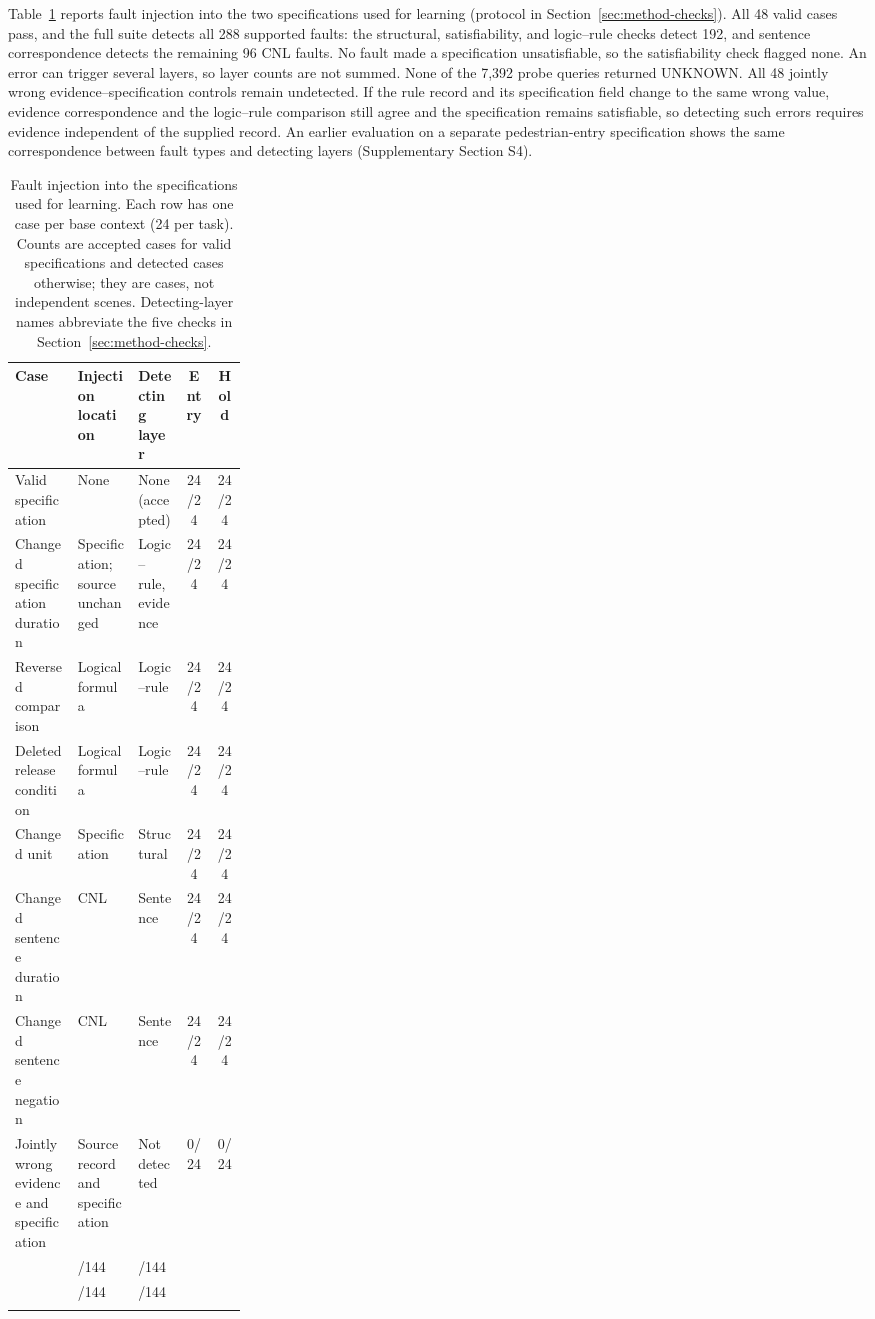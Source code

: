Table~\ref{tab:results-faults} reports fault injection into the two
specifications used for learning (protocol in Section~\ref{sec:method-checks}).
All 48 valid cases pass, and the full suite detects all 288 supported faults:
the structural, satisfiability, and logic--rule checks detect 192, and sentence
correspondence detects the remaining 96 CNL faults. No fault made a
specification unsatisfiable, so the satisfiability check flagged none. An error
can trigger several layers, so layer counts are not summed. None of the 7,392
probe queries returned UNKNOWN. All 48 jointly wrong evidence--specification
controls remain undetected. If the rule record and its specification field
change to the same wrong value, evidence correspondence and the logic--rule comparison
still agree and the specification remains satisfiable, so detecting such errors
requires evidence independent of the supplied record. An earlier evaluation on
a separate pedestrian-entry specification shows the same correspondence
between fault types and detecting layers (Supplementary Section S4).

\begin{table}[tbp]
\caption{Fault injection into the specifications used for learning. Each row
has one case per base context (24 per task). Counts are accepted cases for
valid specifications and detected cases otherwise; they are cases, not
independent scenes. Detecting-layer names abbreviate the five checks in
Section~\ref{sec:method-checks}.}
\label{tab:results-faults}
\footnotesize
\begin{tabularx}{\linewidth}{@{}>{\raggedright\arraybackslash}p{0.27\linewidth}>{\raggedright\arraybackslash}X>{\raggedright\arraybackslash}X cc@{}}
\toprule
Case & Injection location & Detecting layer & Entry & Hold\\
\midrule
Valid specification & None & None (accepted) & 24/24 & 24/24\\[3pt]
Changed specification duration & Specification; source unchanged & Logic--rule, evidence & 24/24 & 24/24\\[3pt]
Reversed comparison & Logical formula & Logic--rule & 24/24 & 24/24\\[3pt]
Deleted release condition & Logical formula & Logic--rule & 24/24 & 24/24\\[3pt]
Changed unit & Specification & Structural & 24/24 & 24/24\\[3pt]
Changed sentence duration & CNL & Sentence & 24/24 & 24/24\\[3pt]
Changed sentence negation & CNL & Sentence & 24/24 & 24/24\\[3pt]
Jointly wrong evidence and specification & Source record and specification & Not detected & 0/24 & 0/24\\
\midrule
\multicolumn{3}{@{}l}{Supported faults: structural, satisfiability, logic--rule} & 96/144 & 96/144\\[3pt]
\multicolumn{3}{@{}l}{Supported faults: full suite} & 144/144 & 144/144\\
\botrule
\end{tabularx}
\end{table}

